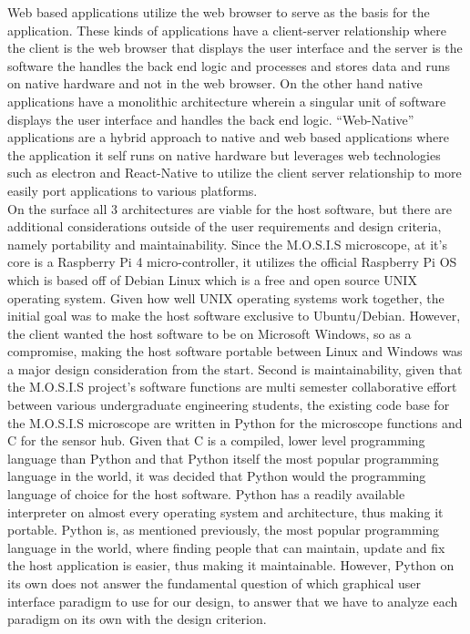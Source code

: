 \documentclass[12pt]{article}
\begin{document}
Web based applications utilize the web browser to serve as the basis for the application. These kinds of applications have a client-server relationship where the client is the web browser that displays the user interface and the server is the software the handles the back end logic and processes and stores data and runs on native hardware and not in the web browser. On the other hand native applications have a monolithic architecture wherein a singular unit of software displays the user interface and handles the back end logic. ``Web-Native'' applications are a hybrid approach to native and web based applications where the application it self runs on native hardware but leverages web technologies such as electron and React-Native to utilize the client server relationship to more easily port applications to various platforms.\\
On the surface all 3 architectures are viable for the host software, but there are additional considerations outside of the user requirements and design criteria, namely portability and maintainability. Since the M.O.S.I.S microscope, at it's core is a Raspberry Pi 4 micro-controller, it utilizes the official Raspberry Pi OS which is based off of Debian Linux which is a free and open source UNIX operating system. Given how well UNIX operating systems work together, the initial goal was to make the host software exclusive to Ubuntu/Debian. However, the client wanted the host software to be on Microsoft Windows, so as a compromise, making the host software portable between Linux and Windows was a major design consideration from the start. Second is maintainability, given that the M.O.S.I.S project's software functions are multi semester collaborative effort between various undergraduate engineering students, the existing code base for the M.O.S.I.S microscope are written in Python for the microscope functions and C for the sensor hub. Given that C is a compiled, lower level programming language than Python and that Python itself the most popular programming language in the world, it was decided that Python would the programming language of choice for the host software. Python has a readily available interpreter on almost every operating system and architecture, thus making it portable. Python is, as mentioned previously, the most popular programming language in the world, where finding people that can maintain, update and fix the host application is easier, thus making it maintainable. However, Python on its own does not answer the fundamental question of which graphical user interface paradigm to use for our design, to answer that we have to analyze each paradigm on its own with the design criterion.\\
\end{document}
